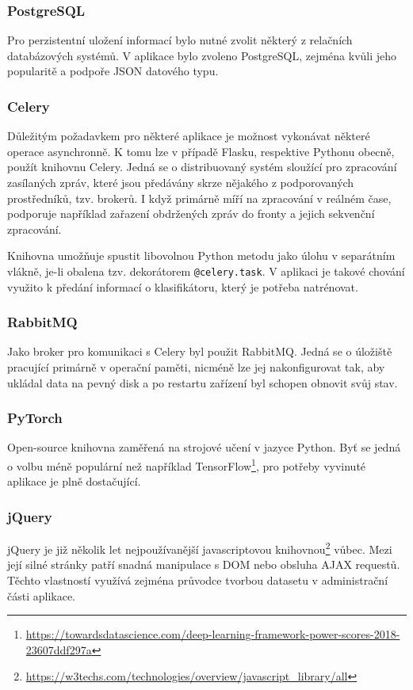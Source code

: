 \documentclass[
  field=ainfp,
  master=true,
  biblatex,
  sourcecodes=false,
  theorems=false,
  glossaries,
  index
]{kidiplom}
\begin{document}
\subsubsection*{PostgreSQL}
Pro perzistentní uložení informací bylo nutné zvolit některý z relačních databázových systémů. V aplikace bylo zvoleno PostgreSQL, zejména kvůli jeho popularitě a podpoře JSON datového typu. 
\subsubsection*{Celery}
Důležitým požadavkem pro některé aplikace je možnost vykonávat některé ope\-race asynchronně. K tomu lze v případě Flasku, respektive Pythonu obecně, použít knihovnu Celery. Jedná se o distribuovaný systém sloužící pro zpracování zasílaných zpráv, které jsou předávány skrze nějakého z podporovaných prostředníků, tzv. brokerů. I když primárně míří na zpracování v reálném čase, podporuje například zařazení obdržených zpráv do fronty a jejich sekvenční zpracování.

Knihovna umožňuje spustit libovolnou Python metodu jako úlohu v separátním vlákně, je-li obalena tzv. dekorátorem \texttt{@celery.task}. V aplikaci je takové chování využito k předání informací o klasifikátoru, který je potřeba natrénovat.

\subsubsection*{RabbitMQ}
Jako broker pro komunikaci s Celery byl použit RabbitMQ. Jedná se o úložiště pracující primárně v operační paměti, nicméně lze jej nakonfigurovat tak, aby ukládal data na pevný disk a po restartu zařízení byl schopen obnovit svůj stav.

\subsubsection*{PyTorch}
Open-source knihovna zaměřená na strojové učení v jazyce Python. Byť se jedná o volbu méně populární než například TensorFlow\footnote{\url{https://towardsdatascience.com/deep-learning-framework-power-scores-2018-23607ddf297a}}, pro potřeby vyvinuté aplikace je plně dostačující.


\subsubsection*{jQuery}
jQuery je již několik let nejpoužívanější javascriptovou knihovnou\footnote{\url{https://w3techs.com/technologies/overview/javascript\_library/all}} vůbec. Mezi její silné stránky patří snadná manipulace s DOM nebo obsluha AJAX requestů. Těchto vlastností využívá zejména průvodce tvorbou datasetu v administrační části aplikace.
\end{document}
